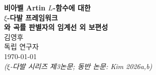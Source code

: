 \documentclass[11pt, a4paper]{article}
\theoremstyle{plain}
\theoremstyle{definition}
\begin{document}
\begin{center}
  {\LARGE\bfseries 비아벨 Artin $L$-함수에 대한}\\[4pt]
  {\LARGE\bfseries $\xi$-다발 프레임워크}\\[6pt]
  {\large\bfseries 와 곡률 판별자의 임계선 외 보편성}\\[18pt]
  {\large 김영후}\\[4pt]
  {\normalsize 독립 연구자}\\[4pt]
  {\small\today}\\[4pt]
  {\small\textit{($\xi$-다발 시리즈 제3논문; 동반 논문: Kim 2026a,b)}}
\end{center}

\vspace{1.5em}
\end{document}
